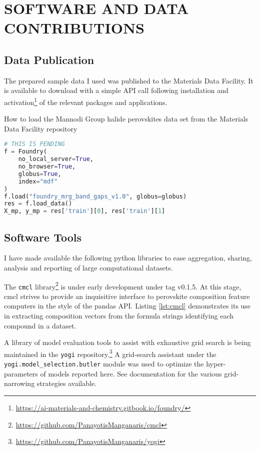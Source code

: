 \chapter{SOFTWARE AND DATA CONTRIBUTIONS}
\label{sec:orgc7f868a}
\section*{Data Publication}
\label{sec:org3731a35}
The prepared sample data I used was published to the Materials Data Facility.
It is available to download with a simple API call following installation and activation\footnote{\url{https://ai-materials-and-chemistry.gitbook.io/foundry/}} of the relevant packages and applications.

\begin{ZZlisting}
  \caption{\label{lst:MDF} How to load the Mannodi Group halide perovskites data set from the Materials Data Facility repository}
  \begin{CenteredBox}
    \begin{lstlisting}[language=python]
# THIS IS PENDING
f = Foundry(
    no_local_server=True,
    no_browser=True,
    globus=True,
    index="mdf"
)
f.load("foundry_mrg_band_gaps_v1.0", globus=globus)
res = f.load_data()
X_mp, y_mp = res['train'][0], res['train'][1]
    \end{lstlisting}
  \end{CenteredBox}
\end{ZZlisting}

\section*{Software Tools}
\label{sec:org660d957}
I have made available the following python libraries to ease aggregation, sharing, analysis and reporting of large computational datasets.

The \texttt{cmcl} library\footnote{\url{https://github.com/PanayotisManganaris/cmcl}} is under early development under tag v0.1.5.
At this stage, cmcl strives to provide an inquisitive interface to perovskite composition feature computers in the style of the pandas API.
Listing \ref{lst:cmcl} demonstrates its use in extracting composition vectors from the formula strings identifying each compound in a dataset.

A library of model evaluation tools to assist with exhaustive grid search is being maintained in the \texttt{yogi} repository.\footnote{\url{https://github.com/PanayotisManganaris/yogi}}
A grid-search assistant under the \texttt{yogi.model\_selection.butler} module was used to optimize the hyper-parameters of models reported here.
See documentation for the various grid-narrowing strategies available.

